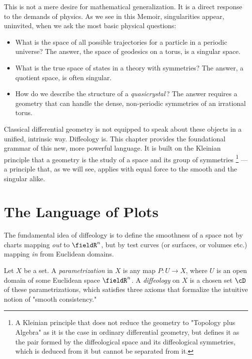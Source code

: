 This is not a mere desire for mathematical generalization.
It is a direct response to the demands of physics.
As we see in this Memoir,
singularities appear,
uninvited,
when we ask the most basic physical questions:

\begin{itemize}
  \item What is the space of all possible trajectories for a particle in a periodic universe?
  The answer,
  the space of geodesics on a torus,
  is a singular space.
  \item What is the true space of states in a theory with symmetries?
  The answer,
  a quotient space,
  is often singular.
  \item How do we describe the structure of a \emph{quasicrystal}\,?
  The answer requires a geometry that can handle the dense,
  non-periodic symmetries of an irrational torus.
\end{itemize}

Classical differential geometry is not equipped to speak about these objects in a unified,
intrinsic way.
Diffeology is.
This chapter provides the foundational grammar of this new,
more powerful language.
It is built on the Kleinian principle that a geometry is the study of a space and its group of symmetries%
\footnote{A Kleinian principle that does not reduce the geometry to "Topology plus Algebra" as it is the case in ordinary differential geometry,
but defines it as the pair formed by the diffeological space and its diffeological symmetries,
which is deduced from it but cannot be separated from it.}
---a principle that,
as we will see,
applies with equal force to the smooth and the singular alike.

\section{The Language of Plots}
\label{sec:The Language of Plots}

The fundamental idea of diffeology is to define the smoothness of a space not by charts mapping \emph{out} to $\fieldR^n$,
but by test curves (or surfaces, or volumes etc.) mapping \emph{in} from Euclidean domains.

Let $X$ be a set.
A \emph{parametrization} in $X$ is any map $P: U \to X$,
where $U$ is an open domain of some Euclidean space $\fieldR^n$.
A \emph{diffeology} on $X$ is a chosen set $\cD$ of these parametrizations,
which satisfies three axioms that formalize the intuitive notion of "smooth consistency."

